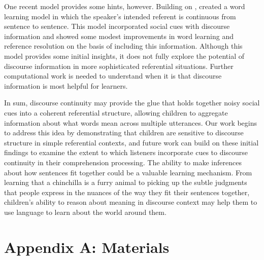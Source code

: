 \documentclass[man]{apa2}
\begin{document}
One recent model provides some hints, however. Building on ,  created a word learning model in which the speaker's intended referent is continuous from sentence to sentence. This model incorporated social cues with discourse information and showed some modest improvements in word learning and reference resolution on the basis of including this information. Although this model provides some initial insights, it does not fully explore the potential of discourse information in more sophisticated referential situations. Further computational work is needed to understand when it is that discourse information is most helpful for learners. 

In sum, discourse continuity may provide the glue that holds together noisy social cues into a coherent referential structure, allowing children to aggregate information about what words mean across multiple utterances.  Our work begins to address this idea by demonstrating that children are sensitive to discourse structure in simple referential contexts, and future work can build on these initial findings to examine the extent to which listeners incorporate cues to discourse continuity in their comprehension processing.  The ability to make inferences about how sentences fit together could be a valuable learning mechanism. From learning that a chinchilla is a furry animal to picking up the subtle judgments that people express in the nuances of the way they fit their sentences together, children's ability to reason about meaning in discourse context may help them to use language to learn about the world around them. 




\newpage
\theappendix 

\section{Appendix A: Materials}
\end{document}
